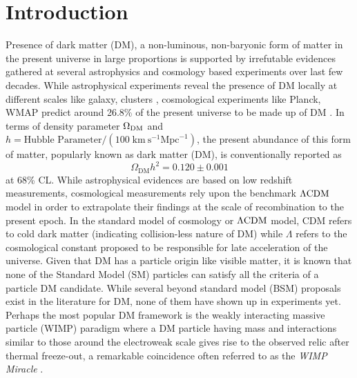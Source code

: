 \documentclass[prd,nofootinbib,preprint,superscriptaddress]{revtex4}
\begin{document}
	\section{Introduction}
	\label{intro}
	Presence of dark matter (DM), a non-luminous, non-baryonic form of matter in the present universe in large proportions is supported by 
	irrefutable evidences gathered at several astrophysics and cosmology based experiments over last few decades. While astrophysical experiments 
	reveal the presence of DM locally at different scales like galaxy, clusters \cite{Zwicky:1933gu, Rubin:1970zza, Clowe:2006eq}, cosmological 
	experiments like Planck, WMAP predict around 26.8\% of the present universe to be made up of DM \cite{Zyla:2020zbs, Aghanim:2018eyx}. In terms of density 
	parameter $\Omega_{\rm DM}$ and $h = \text{Hubble Parameter}/(100 \;\text{km}
	~\text{s}^{-1} \text{Mpc}^{-1})$, the present abundance of this
	form of matter, popularly known as dark matter (DM),
	is conventionally reported as \cite{Aghanim:2018eyx}
	\begin{equation}
		\Omega_{\text{DM}} h^2 = 0.120\pm 0.001 
		\label{dm_relic}
	\end{equation}
	at 68\% CL. While astrophysical evidences are based on low redshift measurements, cosmological measurements rely upon the benchmark ${\rm \Lambda CDM}$ model in order to extrapolate their findings at the scale of recombination to the present epoch. In the standard model of cosmology or ${\rm \Lambda CDM}$ model, CDM refers to cold dark matter (indicating collision-less nature of DM) while $\Lambda$ refers to the cosmological constant proposed to be responsible for late acceleration of the universe. Given that DM has a particle origin like visible matter, it is known that none of the Standard Model (SM) particles can satisfy all the criteria of a particle DM candidate. While several beyond standard model (BSM) proposals exist in the literature for DM, none of them have shown up in experiments yet. Perhaps the most popular DM framework is the weakly interacting massive particle (WIMP) paradigm where a DM particle having mass and interactions similar to those around the electroweak scale gives rise to the observed relic after thermal freeze-out, a remarkable coincidence often referred to as the {\it WIMP Miracle} \cite{Kolb:1990vq}.
	
\end{document}
